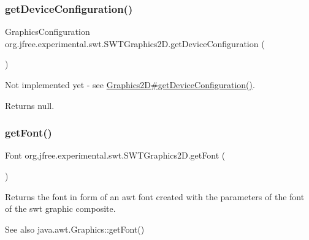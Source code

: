 \subsubsection{\texorpdfstring{get\+Device\+Configuration()}{getDeviceConfiguration()}}
{\footnotesize\ttfamily Graphics\+Configuration org.\+jfree.\+experimental.\+swt.\+S\+W\+T\+Graphics2\+D.\+get\+Device\+Configuration (\begin{DoxyParamCaption}{ }\end{DoxyParamCaption})}

Not implemented yet -\/ see \mbox{\hyperlink{}{Graphics2\+D\#get\+Device\+Configuration()}}.

\begin{DoxyReturn}{Returns}
{\ttfamily null}. 
\end{DoxyReturn}
\mbox{\label{classorg_1_1jfree_1_1experimental_1_1swt_1_1_s_w_t_graphics2_d_a35b02d3641ca7fa7de2a05062c275248}} 
\subsubsection{\texorpdfstring{get\+Font()}{getFont()}}
{\footnotesize\ttfamily Font org.\+jfree.\+experimental.\+swt.\+S\+W\+T\+Graphics2\+D.\+get\+Font (\begin{DoxyParamCaption}{ }\end{DoxyParamCaption})}

Returns the font in form of an awt font created with the parameters of the font of the swt graphic composite. \begin{DoxySeeAlso}{See also}
java.\+awt.\+Graphics\+::get\+Font() 
\end{DoxySeeAlso}
\mbox{\label{classorg_1_1jfree_1_1experimental_1_1swt_1_1_s_w_t_graphics2_d_ab73581967075f5e9876fc90fd4445d02}} 
